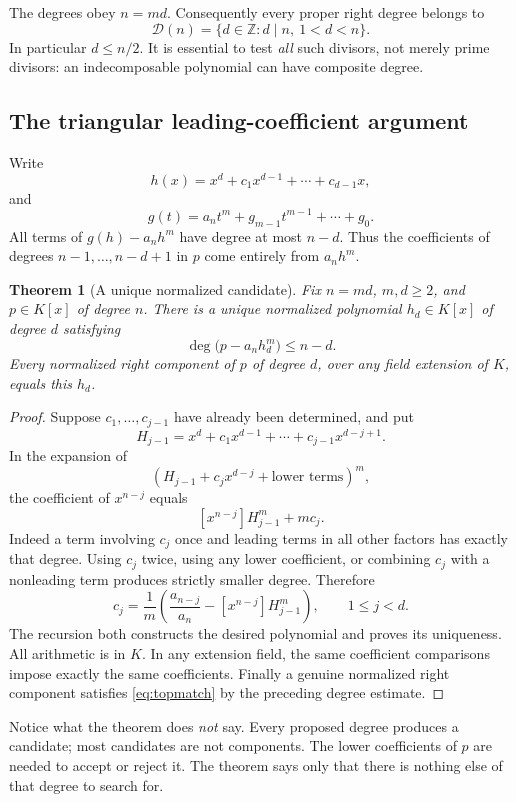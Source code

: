\documentclass[11pt,a4paper]{article}
\newtheorem{theorem}{Theorem}[section]
\theoremstyle{definition}
\newcommand{\Z}{\mathbb Z}
\newcommand{\calD}{\mathcal D}
\begin{document}
The degrees obey $n=md$. Consequently every proper right degree belongs to
\[
 \calD(n)=\{d\in\Z: d\mid n,\ 1<d<n\}.
\]
In particular $d\le n/2$. It is essential to test \emph{all} such divisors, not merely prime divisors: an indecomposable polynomial can have composite degree.

\subsection{The triangular leading-coefficient argument}
Write
\[
 h(x)=x^d+c_1x^{d-1}+\cdots+c_{d-1}x,
\]
and
\[
 g(t)=a_nt^m+g_{m-1}t^{m-1}+\cdots+g_0.
\]
All terms of $g(h)-a_nh^m$ have degree at most $n-d$. Thus the coefficients of degrees $n-1,\ldots,n-d+1$ in $p$ come entirely from $a_nh^m$.

\begin{theorem}[A unique normalized candidate]\label{thm:unique}
Fix $n=md$, $m,d\ge2$, and $p\in K[x]$ of degree $n$. There is a unique normalized polynomial $h_d\in K[x]$ of degree $d$ satisfying
\begin{equation}
 \deg\bigl(p-a_nh_d^m\bigr)\le n-d.\label{eq:topmatch}
\end{equation}
Every normalized right component of $p$ of degree $d$, over \emph{any} field extension of $K$, equals this $h_d$.
\end{theorem}
\begin{proof}
Suppose $c_1,\ldots,c_{j-1}$ have already been determined, and put
\[
 H_{j-1}=x^d+c_1x^{d-1}+\cdots+c_{j-1}x^{d-j+1}.
\]
In the expansion of
\[
 (H_{j-1}+c_jx^{d-j}+\text{lower terms})^m,
\]
the coefficient of $x^{n-j}$ equals
\[
 [x^{n-j}]H_{j-1}^m+m c_j.
\]
Indeed a term involving $c_j$ once and leading terms in all other factors has exactly that degree. Using $c_j$ twice, using any lower coefficient, or combining $c_j$ with a nonleading term produces strictly smaller degree. Therefore
\begin{equation}
 c_j=\frac{1}{m}\left(\frac{a_{n-j}}{a_n}-[x^{n-j}]H_{j-1}^m\right),
 \qquad 1\le j<d.\label{eq:triangular}
\end{equation}
The recursion both constructs the desired polynomial and proves its uniqueness. All arithmetic is in $K$. In any extension field, the same coefficient comparisons impose exactly the same coefficients. Finally a genuine normalized right component satisfies \eqref{eq:topmatch} by the preceding degree estimate.
\end{proof}

Notice what the theorem does \emph{not} say. Every proposed degree produces a candidate; most candidates are not components. The lower coefficients of $p$ are needed to accept or reject it. The theorem says only that there is nothing else of that degree to search for.
\end{document}
